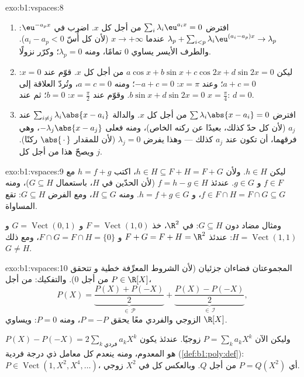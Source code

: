 \begin{solution}{exo:b1:vspaces:8}
\begin{enumerate}
  \item افترض $\sum_{i} \lambda_i \eu^{a_i x} = 0$ من أجل كل $x$.
        اضرب في $\eu^{-a_p x}$: $\lambda_p + \sum_{i < p}
        \lambda_i \eu^{(a_i - a_p)x} \to \lambda_p$ عندما $x \to
        +\infty$ (لأن كل أُسّ $a_i - a_p < 0$). والطرف الأيسر يساوي
        $0$ تمامًا، ومنه $\lambda_p = 0$؛ وكرّر نزولًا.
  \item ليكن $a\cos x + b \sin x + c \cos 2x + d\sin 2x = 0$ من أجل كل
        $x$. قوّم عند $x = 0$: $a + c = 0$؛ وعند $x = \pi$: $-a + c
        = 0$؛ ومنه $a = c = 0$، وتُردّ العلاقة إلى $b\sin
        x + d \sin 2x = 0$. وقوّم عند $x = \frac\pi2$: $b = 0$؛
        ثم عند $x = \frac\pi4$: $d = 0$.
  \item افترض $\sum \lambda_i \abs{x - a_i} = 0$ من أجل كل $x$. والدالة
        $\sum_{i \neq j} \lambda_i\abs{x - a_i}$ 
        عند $a_j$ (لأن كل حدّ كذلك، بعيدًا عن ركنه
        الخاص)، ومنه فعلى $-\lambda_j \abs{x - a_j}$، وهي فرقهما،
        أن تكون  عند $a_j$ كذلك --- وهذا يفرض
        $\lambda_j = 0$ (لأن للمقدار $\abs{\,\cdot\,}$ ركنًا). ويصحّ هذا
        من أجل كل $j$.
\end{enumerate}
\end{solution}

\begin{solution}{exo:b1:vspaces:9}
ليكن $h \in H$. ولأن $h \in H \subseteq F + H = F + G$، اكتب $h = f
+ g$ مع $f \in F$ و $g \in G$. عندئذ $f = h - g \in H$ (لأن الحدّين
في $H$، باستعمال $G \subseteq H$)، ومنه $f \in F \cap H = F \cap G
\subseteq G$، و $h = f + g \in G$. ومنه $H \subseteq G$، ومع
الفرض $G \subseteq H$: تقع المساواة.

ومثال مضاد دون $G \subseteq H$: في $\R^2$، خذ $F =
\operatorname{Vect}(1,0)$ و $G = \operatorname{Vect}(0,1)$ و $H =
\operatorname{Vect}(1,1)$: عندئذ $F + G = F + H = \R^2$ و $F \cap G
= F \cap H = \{0\}$، ومع ذلك $G \neq H$.
\end{solution}

\begin{solution}{exo:b1:vspaces:10}
المجموعتان فضاءان جزئيان (لأن الشروط المعرِّفة خطية و
تتحقق من أجل $0$). والتفكيك: من أجل $P \in \R[X]$،
\[
P(X) = \underbrace{\frac{P(X) + P(-X)}{2}}_{\in\,\mathcal P}
+ \underbrace{\frac{P(X) - P(-X)}{2}}_{\in\,\mathcal I},
\]
 الزوجي والفردي معًا يحقق $P = -P$، ومنه $P = 0$:
 ويساوي $\R[X]$.

وليكن الآن $P = \sum_k a_k X^k$ زوجيًا. عندئذ يكون $P(X) - P(-X) = 2
\sum_{k \text{ فردي}} a_k X^k$ هو  المعدوم، ومنه ينعدم كل
معامل ذي درجة فردية (\cref{def:b1:poly:def}): $P \in
\operatorname{Vect}(1, X^2, X^4, \dots)$، أي $P = Q(X^2)$ من أجل
 $Q$. وبالعكس كل  في $X^2$ زوجي.
\end{solution}

